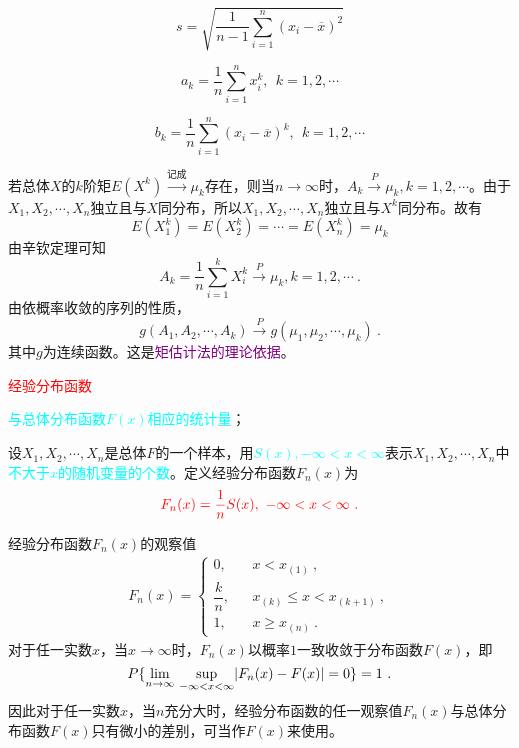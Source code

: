 \documentclass[12pt,a4paper]{article}
\begin{document}
\begin{equation}
s = \sqrt{ \frac{1}{n-1} \sum_{i=1}^{n} (x_i - \overline{x})^2 }
\end{equation}

\begin{equation}
a_k = \frac{1}{n} \sum_{i=1}^{n} x_i^k, ~~k = 1,2,\cdots
\end{equation}

\begin{equation}
b_k = \frac{1}{n} \sum_{i=1}^{n} (x_i-\overline{x})^k, ~~k = 1,2,\cdots
\end{equation}

若总体$X$的$k$阶矩$E(X^k) \stackrel{\text{记成}}\longrightarrow \mu_k$存在，则当$n\rightarrow \infty$时，$A_k \stackrel{P}\longrightarrow \mu_k, k =1 ,2, \cdots$。由于$X_1, X_2, \cdots, X_n$独立且与$X$同分布，所以$X_1, X_2, \cdots, X_n$独立且与$X^k$同分布。故有
\begin{equation*}
E(X^k_1) = E(X^k_2) = \cdots = E(X^k_n) = \mu_k
\end{equation*}
由辛钦定理可知
\begin{equation*}
A_k = \frac{1}{n} \sum_{i=1}^k X_i^k \stackrel{P}\longrightarrow \mu_k, k =1 ,2, \cdots ~.
\end{equation*}
由依概率收敛的序列的性质，
\begin{equation}
g(A_1, A_2, \cdots, A_k) \stackrel{P}\longrightarrow g(\mu_1, \mu_2, \cdots, \mu_k) ~.
\end{equation}
其中$g$为连续函数。这是\textcolor{purple}{矩估计法的理论依据}。

\textcolor{red}{经验分布函数}

\textcolor{cyan}{与总体分布函数$F(x)$相应的统计量}；

设$X_1, X_2, \cdots, X_n$是总体$F$的一个样本，用\textcolor{cyan}{$S(x), -\infty < x < \infty$}表示$X_1, X_2, \cdots, X_n$中\textcolor{cyan}{不大于$x$的随机变量的个数}。定义经验分布函数$F_n(x)$为
\begin{equation}
\color{red} F_n(x) = \frac{1}{n} S(x),~ -\infty < x < \infty ~.
\end{equation}

经验分布函数$F_n(x)$的观察值
\begin{eqnarray*}
F_n(x) = \left\{
\begin{aligned}
0,&& x < x_{(1)} ~,\\
\dfrac{k}{n},&& x_{(k)} \leqslant x <   x_{(k+1)} ~, \\
1,&& x \geqslant x_{(n)} ~.
\end{aligned}
\right.
\end{eqnarray*}
对于任一实数$x$，当$x\rightarrow \infty$时，$F_n(x)$以概率$1$一致收敛于分布函数$F(x)$，即
\begin{equation*}
P\{\underset{n\rightarrow \infty}\lim~ \underset{-\infty < x < \infty}{\rm sup} |F_n(x) -F(x)| = 0 \} = 1 ~.
\end{equation*}
因此对于任一实数$x$，当$n$充分大时，经验分布函数的任一观察值$F_n(x)$与总体分布函数$F(x)$只有微小的差别，可当作$F(x)$来使用。
\end{document}
